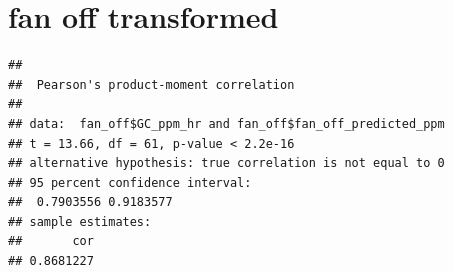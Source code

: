 \documentclass[
]{article}
\newenvironment{Shaded}{\begin{snugshade}}{\end{snugshade}}
\newcommand{\AttributeTok}[1]{\textcolor[rgb]{0.13,0.29,0.53}{#1}}
\newcommand{\CommentTok}[1]{\textcolor[rgb]{0.56,0.35,0.01}{\textit{#1}}}
\newcommand{\FunctionTok}[1]{\textcolor[rgb]{0.13,0.29,0.53}{\textbf{#1}}}
\newcommand{\NormalTok}[1]{#1}
\newcommand{\OtherTok}[1]{\textcolor[rgb]{0.56,0.35,0.01}{#1}}
\newcommand{\SpecialCharTok}[1]{\textcolor[rgb]{0.81,0.36,0.00}{\textbf{#1}}}
\newcommand{\StringTok}[1]{\textcolor[rgb]{0.31,0.60,0.02}{#1}}
\begin{document}
\section{fan off transformed}\label{fan-off-transformed}

\begin{Shaded}
\end{Shaded}

\begin{verbatim}
## 
##  Pearson's product-moment correlation
## 
## data:  fan_off$GC_ppm_hr and fan_off$fan_off_predicted_ppm
## t = 13.66, df = 61, p-value < 2.2e-16
## alternative hypothesis: true correlation is not equal to 0
## 95 percent confidence interval:
##  0.7903556 0.9183577
## sample estimates:
##       cor 
## 0.8681227
\end{verbatim}
\end{document}
